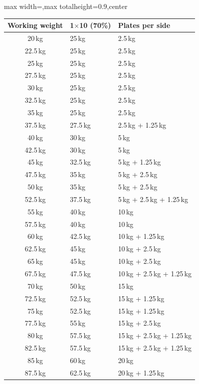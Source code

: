 \documentclass[11pt,a4paper]{article}
\newcommand{\tablearraystretch}{1.15}
\begin{document}
\begin{center}
\renewcommand{\arraystretch}{\tablearraystretch}
\begin{adjustbox}{max width=\linewidth,max totalheight=0.9\textheight,center}
\begin{tabular}{cll}
\toprule
Working weight & 1$\times$10 (70\%) & Plates per side \\
\midrule
20\,kg   & 25\,kg   & 2.5\,kg \\
22.5\,kg & 25\,kg   & 2.5\,kg \\
25\,kg   & 25\,kg   & 2.5\,kg \\
27.5\,kg & 25\,kg   & 2.5\,kg \\
30\,kg   & 25\,kg   & 2.5\,kg \\
32.5\,kg & 25\,kg   & 2.5\,kg \\
35\,kg   & 25\,kg   & 2.5\,kg \\
37.5\,kg & 27.5\,kg & 2.5\,kg + 1.25\,kg \\
40\,kg   & 30\,kg   & 5\,kg \\
42.5\,kg & 30\,kg   & 5\,kg \\
45\,kg   & 32.5\,kg & 5\,kg + 1.25\,kg \\
47.5\,kg & 35\,kg   & 5\,kg + 2.5\,kg \\
50\,kg   & 35\,kg   & 5\,kg + 2.5\,kg \\
52.5\,kg & 37.5\,kg & 5\,kg + 2.5\,kg + 1.25\,kg \\
55\,kg   & 40\,kg   & 10\,kg \\
57.5\,kg & 40\,kg   & 10\,kg \\
60\,kg   & 42.5\,kg & 10\,kg + 1.25\,kg \\
62.5\,kg & 45\,kg   & 10\,kg + 2.5\,kg \\
65\,kg   & 45\,kg   & 10\,kg + 2.5\,kg \\
67.5\,kg & 47.5\,kg & 10\,kg + 2.5\,kg + 1.25\,kg \\
70\,kg   & 50\,kg   & 15\,kg \\
72.5\,kg & 52.5\,kg & 15\,kg + 1.25\,kg \\
75\,kg   & 52.5\,kg & 15\,kg + 1.25\,kg \\
77.5\,kg & 55\,kg   & 15\,kg + 2.5\,kg \\
80\,kg   & 57.5\,kg & 15\,kg + 2.5\,kg + 1.25\,kg \\
82.5\,kg & 57.5\,kg & 15\,kg + 2.5\,kg + 1.25\,kg \\
85\,kg   & 60\,kg   & 20\,kg \\
87.5\,kg & 62.5\,kg & 20\,kg + 1.25\,kg \\

\end{tabular}
\end{adjustbox}
\end{center}
\end{document}
